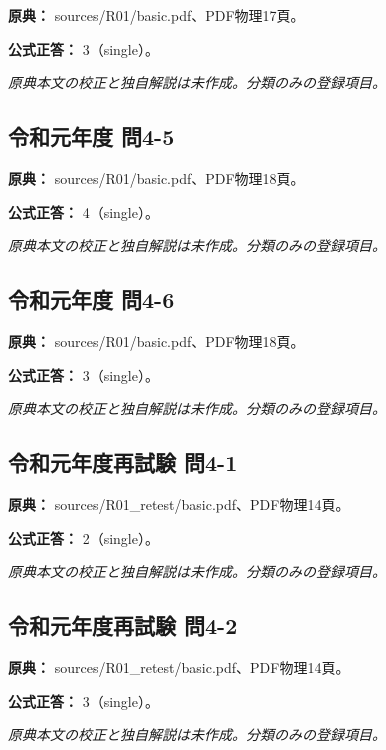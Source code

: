 \noindent\textbf{原典：} sources/R01/basic.pdf、PDF物理17頁。

\textbf{公式正答：} 3（single）。

\par\textit{原典本文の校正と独自解説は未作成。分類のみの登録項目。}

\subsection{令和元年度 問4-5}
\label{q:r01-reg-basic-4-5}

\noindent\textbf{原典：} sources/R01/basic.pdf、PDF物理18頁。

\textbf{公式正答：} 4（single）。

\par\textit{原典本文の校正と独自解説は未作成。分類のみの登録項目。}

\subsection{令和元年度 問4-6}
\label{q:r01-reg-basic-4-6}

\noindent\textbf{原典：} sources/R01/basic.pdf、PDF物理18頁。

\textbf{公式正答：} 3（single）。

\par\textit{原典本文の校正と独自解説は未作成。分類のみの登録項目。}

\subsection{令和元年度再試験 問4-1}
\label{q:r01-ret-basic-4-1}

\noindent\textbf{原典：} sources/R01\_retest/basic.pdf、PDF物理14頁。

\textbf{公式正答：} 2（single）。

\par\textit{原典本文の校正と独自解説は未作成。分類のみの登録項目。}

\subsection{令和元年度再試験 問4-2}
\label{q:r01-ret-basic-4-2}

\noindent\textbf{原典：} sources/R01\_retest/basic.pdf、PDF物理14頁。

\textbf{公式正答：} 3（single）。

\par\textit{原典本文の校正と独自解説は未作成。分類のみの登録項目。}

